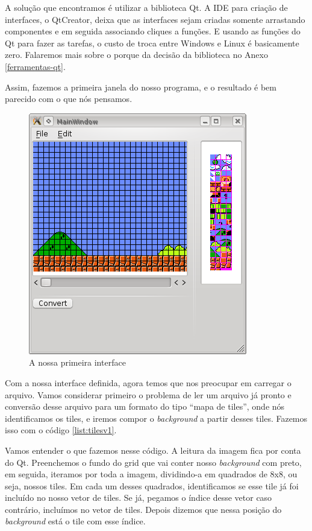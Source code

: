 \documentclass[brazil]{abnt}
\begin{document}
A solução que encontramos é utilizar a biblioteca Qt. A IDE para criação de interfaces, o QtCreator, deixa que as interfaces sejam criadas somente arrastando componentes e em seguida associando cliques a funções. E usando as funções do Qt para fazer as tarefas, o custo de troca entre Windows e Linux é basicamente zero. Falaremos mais sobre o porque da decisão da biblioteca no Anexo \ref{ferramentas-qt}.

Assim, fazemos a primeira janela do nosso programa, e o resultado é bem parecido com o que nós pensamos.

\begin{figure}[h!]
\centering
\includegraphics{imgs/mainwindow_1.png}
\caption{A nossa primeira interface} 
\end{figure}

Com a nossa interface definida, agora temos que nos preocupar em carregar o arquivo. Vamos considerar primeiro o problema de ler um arquivo já pronto e conversão desse arquivo para um formato do tipo ``mapa de tiles'', onde nós identificamos os tiles, e iremos compor o \textit{background} a partir desses tiles. Fazemos isso com o código \ref{list:tilesv1}.

Vamos entender o que fazemos nesse código. A leitura da imagem fica por conta do Qt. Preenchemos o fundo do grid que vai conter nosso \textit{background} com preto, em seguida, iteramos por toda a imagem, dividindo-a em quadrados de 8x8, ou seja, nossos tiles. Em cada um desses quadrados, identificamos se esse tile já foi incluído no nosso vetor de tiles. Se já, pegamos o índice desse vetor caso contrário, incluímos no vetor de tiles. Depois dizemos que nessa posição do \textit{background} está o tile com esse índice. 
\end{document}
